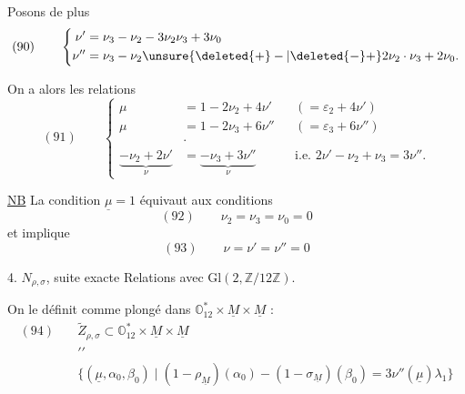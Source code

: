 
Posons de plus
\[
(90)\qquad
\left\{\begin{aligned}
\nu'&=\nu_3-\nu_2-3\nu_2\nu_3+3\nu_0\\
\nu''&=\nu_3-\nu_2\unsure{\deleted{+}-|\deleted{-}+}2\nu_2\cdot\nu_3+2\nu_0.
\end{aligned}\right.
\]

On a alors les relations
\[
(91)\qquad
\left\{\begin{aligned}
\mu&=1-2\nu_2+4\nu'&&({}=\varepsilon_2+4\nu')\\
\mu&=1-2\nu_3+6\nu''&&({}=\varepsilon_3+6\nu'')\\[6pt]
&\cdot\\[-3pt]
\underbrace{-\nu_2+2\nu'}_{\nu}&=
\underbrace{-\nu_3+3\nu''}_{\nu}
&&\text{i.e. }2\nu'-\nu_2+\nu_3=3\nu''.
\end{aligned}\right.
\]

\uline{NB} La condition $\underline\mu=1$ équivaut aux conditions
\[
(92)\qquad \nu_2=\nu_3=\nu_0=0
\]
et implique
\[
(93)\qquad \nu=\nu'=\nu''=0
\]


4. 
$N_{\rho,\sigma}$, 
suite exacte
Relations avec $\mathrm{Gl}(2,\mathbb Z/12\mathbb Z)$.

On le définit comme plongé dans
$\mathbb O_{12}^{*}\times\underline M\times\underline M$ :
\[
\begin{aligned}
(94)\quad&\widetilde Z_{\rho,\sigma}
\subset \mathbb O_{12}^{*}\times\underline M\times\underline M\\[-2pt]
&\prime\prime\\[-2pt]
&\bigl\{(\underline\mu,\alpha_0,\beta_0)\mid
(1-\rho_{\underline M})(\alpha_0)-(1-\sigma_{\underline M})(\beta_0)
=3\nu''(\underline\mu)\lambda_1\bigr\}
\end{aligned}
\]


